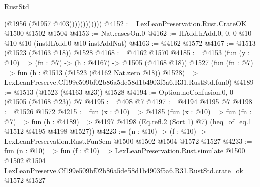 \begin{lexlean}{RustStd}
\begin{coremodule}
                        (@1956 (@1957 @403))))))))))))
@4152 := LexLeanPreservation.Rust.CrateOK @1500 @1502 @1504
@4153 := Nat.casesOn.{0}
@4162 := HAdd.hAdd.{0, 0, 0} @10 @10 @10 (instHAdd.{0} @10 instAddNat)
@4163 := @4162 @1572
@4167 := @1513 (@1523 (@4163 @18)) @1528
@4168 := @4162 @1570
@4185 := @4153
    (fun (y : @10) => (fn : @7) -> (h : @4167) -> @1505 (@4168 @18))
    @1527
    (fun (fn : @7) =>
    fun (h : @1513 (@1523 (@4162 Nat.zero @18)) @1528) =>
    LexLeanPreserve.Cf199e509bf02b86a5de58d1b4903f5a6.R31.RustStd.fun0)
@4189 := @1513 (@1523 (@4163 @23)) @1528
@4194 := Option.noConfusion.{0, 0} (@1505 (@4168 @23)) @7
@4195 := @408 @7
@4197 := @4194 @4195 @7
@4198 := @1526 @1572
@4215 := fun (x : @10) =>
  @4185
    (fun (x : @10) =>
    fun (fn : @7) =>
    fun (h : @4189) =>
    @4197 @4198 (Eq.refl.{2} (Sort 1) @7) (heq_of_eq.{1} @1512 @4195 @4198 @1527))
@4223 := (n : @10) -> (f : @10) -> LexLeanPreservation.Rust.FunSem @1500 @1502 @1504 @1572 @1527
@4233 := fun (n : @10) =>
  fun (f : @10) =>
  LexLeanPreservation.Rust.simulate
    @1500
    @1502
    @1504
    LexLeanPreserve.Cf199e509bf02b86a5de58d1b4903f5a6.R31.RustStd.crate_ok
    @1572
    @1527
\end{coremodule}
\end{lexlean}

